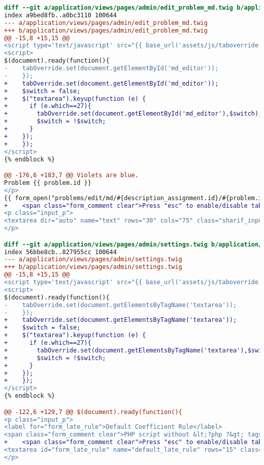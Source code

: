 \begin{lstlisting}[language=diff, caption=Perubahan untuk mematuhi kriteria 2.1.2, label=lst_2.1.2, basicstyle=\ttfamily, frame=single,
columns=fullflexible, keepspaces=true, breaklines=true]
diff --git a/application/views/pages/admin/edit_problem_md.twig b/application/views/pages/admin/edit_problem_md.twig
index a9bed8fb..a0bc3110 100644
--- a/application/views/pages/admin/edit_problem_md.twig
+++ b/application/views/pages/admin/edit_problem_md.twig
@@ -15,8 +15,15 @@
<script type='text/javascript' src="{{ base_url('assets/js/taboverride.min.js') }}"></script>
<script>
$(document).ready(function(){
-    tabOverride.set(document.getElementById('md_editor'));
-    });
+    tabOverride.set(document.getElementById('md_editor'));
+    $switch = false;
+    $("textarea").keyup(function (e) {
+      if (e.which==27){
+        tabOverride.set(document.getElementById('md_editor'),$switch);
+        $switch = !$switch;
+      }
+    });
+    });
</script>
{% endblock %}

@@ -176,6 +183,7 @@ Violets are blue.
Problem {{ problem.id }}
</p>
{{ form_open("problems/edit/md/#{description_assignment.id}/#{problem.id}") }}
+    <span class="form_comment clear">Press "esc" to enable/disable tabindent</span><br>
<p class="input_p">
<textarea dir="auto" name="text" rows="30" cols="75" class="sharif_input" id="md_editor">{{ problem.description }}</textarea>
</p>

diff --git a/application/views/pages/admin/settings.twig b/application/views/pages/admin/settings.twig
index 56bbe8cb..827955cc 100644
--- a/application/views/pages/admin/settings.twig
+++ b/application/views/pages/admin/settings.twig
@@ -15,8 +15,15 @@
<script type='text/javascript' src="{{ base_url('assets/js/taboverride.min.js') }}"></script>
<script>
$(document).ready(function(){
-    tabOverride.set(document.getElementsByTagName('textarea'));
-    });
+    tabOverride.set(document.getElementsByTagName('textarea'));
+    $switch = false;
+    $("textarea").keyup(function (e) {
+      if (e.which==27){
+        tabOverride.set(document.getElementsByTagName('textarea'),$switch);
+        $switch = !$switch;
+      }
+    });
+    });
</script>
{% endblock %}

@@ -122,6 +129,7 @@ $(document).ready(function(){
<p class="input_p">
<label for="form_late_rule">Default Coefficient Rule</label>
<span class="form_comment clear">PHP script without &lt;?php ?&gt; tags</span><br>
+    <span class="form_comment clear">Press "esc" to enable/disable tabindent</span><br>
<textarea id="form_late_rule" name="default_late_rule" rows="15" class="sharif_input add_text clear">{{ default_late_rule }}</textarea>
</p>


\end{lstlisting}
